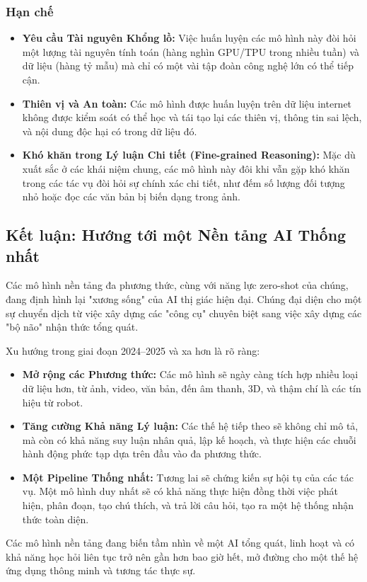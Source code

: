 \subsubsection{Hạn chế}
\label{subsubsec:mfm_disadvantages}
\begin{itemize}
	\item \textbf{Yêu cầu Tài nguyên Khổng lồ:} Việc huấn luyện các mô hình này đòi hỏi một lượng tài nguyên tính toán (hàng nghìn GPU/TPU trong nhiều tuần) và dữ liệu (hàng tỷ mẫu) mà chỉ có một vài tập đoàn công nghệ lớn có thể tiếp cận.
	\item \textbf{Thiên vị và An toàn:} Các mô hình được huấn luyện trên dữ liệu internet không được kiểm soát có thể học và tái tạo lại các thiên vị, thông tin sai lệch, và nội dung độc hại có trong dữ liệu đó.
	\item \textbf{Khó khăn trong Lý luận Chi tiết (Fine-grained Reasoning):} Mặc dù xuất sắc ở các khái niệm chung, các mô hình này đôi khi vẫn gặp khó khăn trong các tác vụ đòi hỏi sự chính xác chi tiết, như đếm số lượng đối tượng nhỏ hoặc đọc các văn bản bị biến dạng trong ảnh.
\end{itemize}

\subsection{Kết luận: Hướng tới một Nền tảng AI Thống nhất}
\label{subsec:mfm_conclusion}
Các mô hình nền tảng đa phương thức, cùng với năng lực zero-shot của chúng, đang định hình lại "xương sống" của AI thị giác hiện đại. Chúng đại diện cho một sự chuyển dịch từ việc xây dựng các "công cụ" chuyên biệt sang việc xây dựng các "bộ não" nhận thức tổng quát.

Xu hướng trong giai đoạn 2024–2025 và xa hơn là rõ ràng:
\begin{itemize}
	\item \textbf{Mở rộng các Phương thức:} Các mô hình sẽ ngày càng tích hợp nhiều loại dữ liệu hơn, từ ảnh, video, văn bản, đến âm thanh, 3D, và thậm chí là các tín hiệu từ robot.
	\item \textbf{Tăng cường Khả năng Lý luận:} Các thế hệ tiếp theo sẽ không chỉ mô tả, mà còn có khả năng suy luận nhân quả, lập kế hoạch, và thực hiện các chuỗi hành động phức tạp dựa trên đầu vào đa phương thức.
	\item \textbf{Một Pipeline Thống nhất:} Tương lai sẽ chứng kiến sự hội tụ của các tác vụ. Một mô hình duy nhất sẽ có khả năng thực hiện đồng thời việc phát hiện, phân đoạn, tạo chú thích, và trả lời câu hỏi, tạo ra một hệ thống nhận thức toàn diện.
\end{itemize}
Các mô hình nền tảng đang biến tầm nhìn về một AI tổng quát, linh hoạt và có khả năng học hỏi liên tục trở nên gần hơn bao giờ hết, mở đường cho một thế hệ ứng dụng thông minh và tương tác thực sự.

